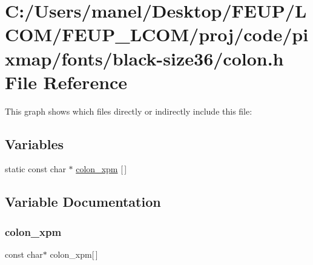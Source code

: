 \hypertarget{black-size36_2colon_8h}{}\section{C\+:/\+Users/manel/\+Desktop/\+F\+E\+U\+P/\+L\+C\+O\+M/\+F\+E\+U\+P\+\_\+\+L\+C\+O\+M/proj/code/pixmap/fonts/black-\/size36/colon.h File Reference}
\label{black-size36_2colon_8h}
This graph shows which files directly or indirectly include this file\+:
\subsection*{Variables}
\begin{DoxyCompactItemize}
\item 
static const char $\ast$ \mbox{\hyperlink{black-size36_2colon_8h_ab9a7531da7b2bda5acd6c2af1d4a112e}{colon\+\_\+xpm}} \mbox{[}$\,$\mbox{]}
\end{DoxyCompactItemize}


\subsection{Variable Documentation}
\mbox{\label{black-size36_2colon_8h_ab9a7531da7b2bda5acd6c2af1d4a112e}} 
\subsubsection{\texorpdfstring{colon\_xpm}{colon\_xpm}}
{\footnotesize\ttfamily const char$\ast$ colon\+\_\+xpm\mbox{[}$\,$\mbox{]}\hspace{0.3cm}{\ttfamily [static]}}

